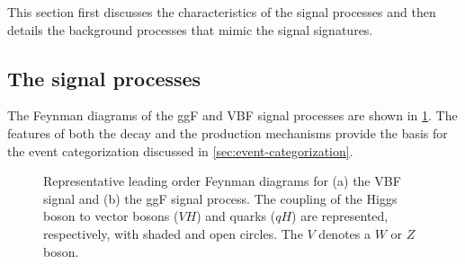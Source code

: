 This section first discusses the characteristics of the signal processes and then details the background processes that mimic the signal signatures.

\subsection{The signal processes}
\label{subsec:signal-bkg-characterisation}
The Feynman diagrams of the ggF and VBF signal processes are shown in \cref{fig:feyn:sig-wwprod}.
The features of both the \HWWdet decay and the production mechanisms provide the basis for the event categorization discussed in \cref{sec:event-categorization}. 

\captionsetup[subfloat]{captionskip=10pt}
\begin{figure}[ht]
    \caption[Feynman diagrams for the VBF and ggF signal.]{Representative leading order Feynman diagrams for (a) the VBF signal and (b) the ggF signal process. The coupling of the Higgs boson to vector bosons ($VH$) and quarks ($qH$) are represented, respectively, with shaded and open circles. The $V$ denotes a $W$ or $Z$ boson.} 
    \label{fig:feyn:sig-wwprod}
\end{figure}
\resetcaptionoffset

